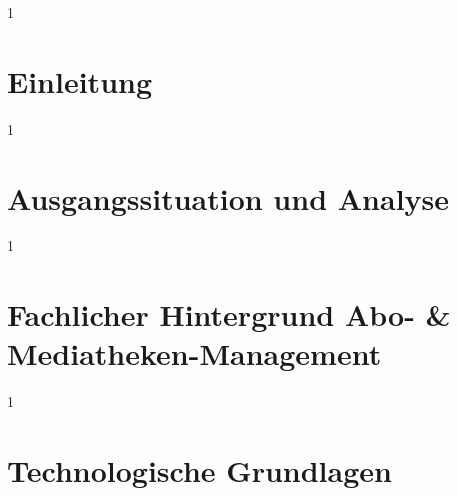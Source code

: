 \documentclass[12pt,a4paper,titlepage,listof=totoc,bibliography=totoc,chapteratlists=0pt]{scrreprt}
\title{\thesistitle}
\author{\firstauthor, \secondauthor}
\author{\firstauthor, \secondauthor, \thirdauthor}
\author{\firstauthor, \secondauthor, \thirdauthor, \fourthauthor}
\begin{document}
\newcommand{\reminder}[1]
{ \textcolor{red}{<[{\bf\marginpar{\mbox{$<==$}} #1 }]>} }
\newcommand{\icode}[1]{\lstinline$#1$}
\renewcommand{\arraystretch}{1.2}


\newpage





\pagestyle{plain}

{
	\renewcommand{\lstlistlistingname}{Quellcodeverzeichnis}
}
{
}

\tableofcontents
\newpage
\setcounter{RPages}{\value{page}}
\setcounter{page}{0}
\pagestyle{scrheadings}



\begin{spacing}{1}
\chapter{Einleitung}\label{chapter:introduction}
\end{spacing}


\begin{spacing}{1}
\chapter{Ausgangssituation und Analyse}\label{chapter:problems}
\end{spacing}


\begin{spacing}{1}
\chapter{Fachlicher Hintergrund Abo- \& Mediatheken-Management}\label{chapter:backgroundInfo}
\end{spacing}


\begin{spacing}{1}
\chapter{Technologische Grundlagen}\label{chapter:technologies}
\end{spacing}

\end{document}
